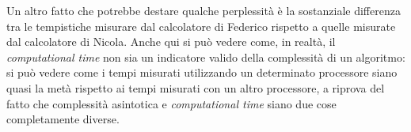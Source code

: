 Un altro fatto che potrebbe destare qualche perplessità è la sostanziale differenza tra le tempistiche misurare dal calcolatore di Federico rispetto a quelle misurate dal calcolatore di Nicola. Anche qui si può vedere come, in realtà, il \emph{computational time} non sia un indicatore valido della complessità di un algoritmo: si può vedere come i tempi misurati utilizzando un determinato processore siano quasi la metà rispetto ai tempi misurati con un altro processore, a riprova del fatto che complessità asintotica e \emph{computational time} siano due cose completamente diverse.